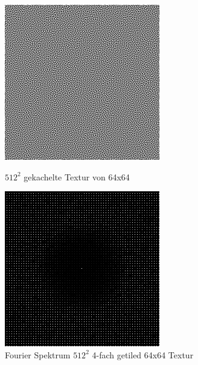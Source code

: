 \begin{figure}[H]\label{pic:tiledBlueNoiseFFT}
    \centering
    \begin{minipage}[t]{0.45\linewidth}
        \centering
        \includegraphics[width=\linewidth]{content/BlueNoise/Bilder/tiled4times.png}
        \caption{$512^{2}$ gekachelte Textur von 64x64}
    \end{minipage}
    \hfill
    \begin{minipage}[t]{0.45\linewidth}
        \centering
        \includegraphics[width=\linewidth]{content/BlueNoise/Bilder/FFTtiled4times.png}
        \caption{Fourier Spektrum $512^{2}$ 4-fach getiled 64x64 Textur}
    \end{minipage}
\end{figure}

